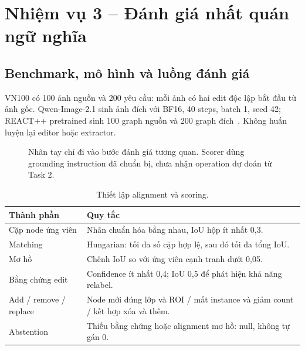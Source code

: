 \clearpage
\section{Nhiệm vụ 3 -- Đánh giá nhất quán ngữ nghĩa}
\subsection{Benchmark, mô hình và luồng đánh giá}
VN100 có 100 ảnh nguồn và 200 yêu cầu: mỗi ảnh có hai edit độc lập bắt đầu từ
ảnh gốc. Qwen-Image-2.1 sinh ảnh đích với BF16, 40 steps, batch 1, seed 42;
REACT++ pretrained sinh 100 graph nguồn và 200 graph đích~\cite{qwenimage21,reactplusplus}.
Không huấn luyện lại editor hoặc extractor.

\begin{figure}[H]\centering
{}
\caption{Nhãn tay chỉ đi vào bước đánh giá tương quan. Scorer dùng grounding
instruction đã chuẩn bị, chưa nhận operation dự đoán từ Task 2.}
\end{figure}

\begin{table}[H]\centering\small
\caption{Thiết lập alignment và scoring.}
\begin{tabularx}{\linewidth}{@{}p{42mm}X@{}}\toprule
Thành phần & Quy tắc\\\midrule
Cặp node ứng viên & Nhãn chuẩn hóa bằng nhau, IoU hộp ít nhất 0,3.\\
Matching & Hungarian: tối đa số cặp hợp lệ, sau đó tối đa tổng IoU.\\
Mơ hồ & Chênh IoU so với ứng viên cạnh tranh dưới 0,05.\\
Bằng chứng edit & Confidence ít nhất 0,4; IoU 0,5 để phát hiện khả năng relabel.\\
Add / remove / replace & Node mới đúng lớp và ROI / mất instance và giảm count / kết hợp xóa và thêm.\\
Abstention & Thiếu bằng chứng hoặc alignment mơ hồ: null, không tự gán 0.\\
\bottomrule\end{tabularx}\end{table}

